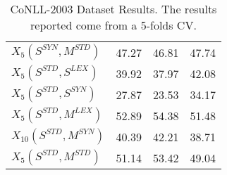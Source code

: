\begin{table}[]
\begin{tabular}{@{\makebox[1.50em][l]{\rownumber\space}}lccc@{}}
$X_5(S^{SYN}, M^{STD})$  & 47.27           & 46.81            & 47.74           \\  
%
$X_5(S^{STD}, S^{LEX})$      & 39.92           & 37.97           & 42.08           \\
$X_5(S^{STD}, S^{SYN})$  &27.87				&23.53						&34.17    \\ 
$X_5(S^{STD}, M^{LEX})$  & 52.89           & 54.38            & 51.48           \\ 
$X_{10}(S^{STD}, M^{SYN})$  & 40.39           & 42.21            & 38.71           \\ 
$X_5(S^{STD}, M^{STD})$  &51.14	&53.42	&49.04            \\  \bottomrule
\end{tabular}
\caption{CoNLL-2003 Dataset Results. The results reported come from a 5-folds CV.}
\label{tab:wikigold}
\end{table}

